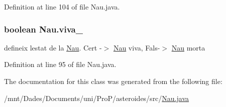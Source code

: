 Definition at line 104 of file Nau.\+java.

\hypertarget{class_nau_a165d7613744bb71f472d6bc56aa65540}{}
\subsubsection[{viva\+\_\+}]{\setlength{\rightskip}{0pt plus 5cm}boolean Nau.\+viva\+\_\+\hspace{0.3cm}{\ttfamily [private]}}\label{class_nau_a165d7613744bb71f472d6bc56aa65540}


defineix l\textquotesingle{}estat de la \hyperlink{class_nau}{Nau}. Cert -\/$>$ \hyperlink{class_nau}{Nau} viva, Fals-\/$>$ \hyperlink{class_nau}{Nau} morta 



Definition at line 95 of file Nau.\+java.



The documentation for this class was generated from the following file\+:\begin{DoxyCompactItemize}
\item 
/mnt/\+Dades/\+Documents/uni/\+Pro\+P/asteroides/src/\hyperlink{_nau_8java}{Nau.\+java}\end{DoxyCompactItemize}
